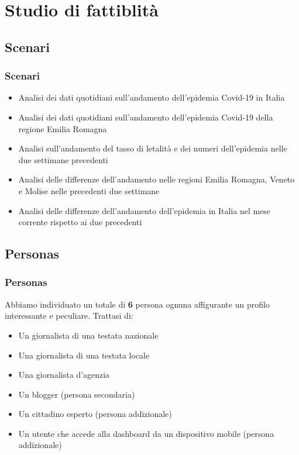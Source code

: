 \documentclass[handout]{beamer}
\begin{document}
	\section{Studio di fattiblità}
		\subsection{Scenari}
		\begin{frame}
			\frametitle{Scenari}
			\begin{itemize}[<+->]
				\item Analisi dei dati quotidiani sull'andamento dell'epidemia Covid-19 in Italia\\
				\item Analisi dei dati quotidiani sull'andamento dell'epidemia Covid-19 della regione Emilia Romagna\\
				\item Analisi sull'andamento del tasso di letalità e dei numeri dell'epidemia nelle due settimane precedenti\\
				\item Analisi delle differenze dell'andamento nelle regioni Emilia Romagna, Veneto e Molise nelle precedenti due settimane\\
				\item Analisi delle differenze dell'andamento dell'epidemia in Italia nel mese corrente rispetto ai due precedenti\\
			\end{itemize}
		\end{frame}

		\subsection{Personas}
		\begin{frame}
			\frametitle{Personas}
			Abbiamo individuato un totale di \textbf{6} persona ognuna affigurante un profilo interessante e peculiare. Trattasi di:
			\begin{itemize}[<+->]
				\item Un giornalista di una testata nazionale\\
				\item Una giornalista di una testata locale\\
				\item Una giornalista d'agenzia\\
				\item Un blogger (persona secondaria)\\
				\item Un cittadino esperto (persona addizionale)\\
				\item Un utente che accede alla dashboard da un dispositivo mobile (persona addizionale)\\
			\end{itemize}
		\end{frame}
\end{document}
